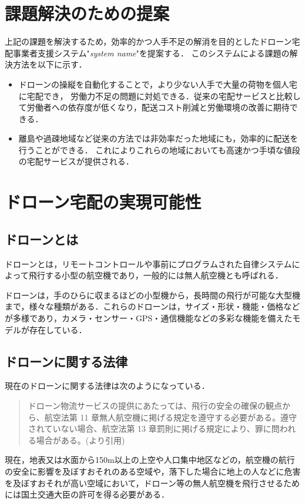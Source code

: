 \documentclass[a4paper, titlepage]{jsarticle}
\newcommand{\system}{\textsl{system name}}
\begin{document}
\section{課題解決のための提案}
上記の課題を解決するため，効率的かつ人手不足の解消を目的としたドローン宅配事業者支援システム"\system "を提案する．
このシステムによる課題の解決方法を以下に示す．
\begin{itemize}
  \item ドローンの操縦を自動化することで，より少ない人手で大量の荷物を個人宅に宅配でき，
        労働力不足の問題に対処できる．従来の宅配サービスと比較して労働者への依存度が低くなり，配送コスト削減と労働環境の改善に期待できる．
  \item 離島や過疎地域など従来の方法では非効率だった地域にも，効率的に配送を行うことができる．
        これによりこれらの地域においても高速かつ手頃な値段の宅配サービスが提供される．
\end{itemize}

\section{ドローン宅配の実現可能性}
\subsection{ドローンとは}
ドローンとは，リモートコントロールや事前にプログラムされた自律システムによって飛行する小型の航空機であり，一般的には無人航空機とも呼ばれる．

ドローンは，手のひらに収まるほどの小型機から，長時間の飛行が可能な大型機まで，様々な種類がある．これらのドローンは，サイズ・形状・機能・価格などが多様であり，カメラ・センサー・GPS・通信機能などの多彩な機能を備えたモデルが存在している．

\subsection{ドローンに関する法律}
現在のドローンに関する法律は次のようになっている．
\begin{quote}
  ドローン物流サービスの提供にあたっては、飛行の安全の確保の観点から、航空法第 11 章無人航空機に掲げる規定を遵守する必要がある。遵守されていない場合、航空法第 13 章罰則に掲げる規定により、罪に問われる場合がある。(\cite{delivery_guidelines_2023}より引用)
\end{quote}

現在，地表又は水面から150m以上の上空や人口集中地区などの，航空機の航行の安全に影響を及ぼすおそれのある空域や，落下した場合に地上の人などに危害を及ぼすおそれが高い空域において，ドローン等の無人航空機を飛行させるためには国土交通大臣の許可を得る必要がある．
\end{document}
